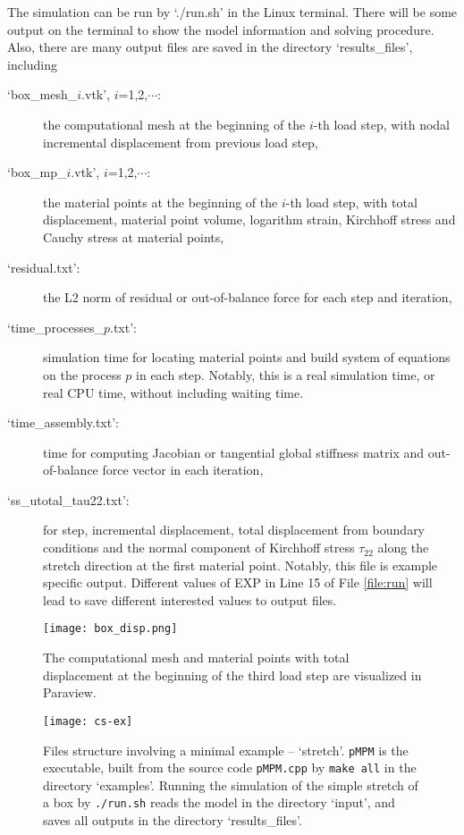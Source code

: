 \documentclass[10pt,a4paper]{article}
\newcommand{\code}[1]{\texttt{#1}}
\begin{document}
The simulation can be run by `./run.sh' in the Linux terminal. There will be some output on the terminal to show the model information and solving procedure. Also, there are many output files are saved in the directory `results\_files', including 
\begin{description}

\item[`box\_mesh\_$i$.vtk', $i$=1,2,$\cdots$:]  the computational mesh at the beginning of the $i$-th load step, with nodal incremental displacement from previous load step, 
\item[`box\_mp\_$i$.vtk', $i$=1,2,$\cdots$:] the material points at the beginning of the $i$-th load step, with total displacement, material point volume, logarithm strain, Kirchhoff stress and Cauchy stress at material points,
\item[`residual.txt':] the L2 norm of residual or out-of-balance force for each step and iteration,
\item[`time\_processes\_$p$.txt':] simulation time for locating material points and build system of equations on the process $p$ in each step. Notably, this is a real simulation time, or real CPU time, without including waiting time. 
\item[`time\_assembly.txt':] time for computing Jacobian or tangential global stiffness matrix and out-of-balance force vector in each iteration, 
\item[`ss\_utotal\_tau22.txt':] for step, incremental displacement, total displacement from boundary conditions and the normal component of Kirchhoff stress $\tau_{22}$ along the stretch direction at the first material point. Notably, this file is example specific output. Different values of EXP in Line 15 of File \ref{file:run} will lead to save different interested values to output files. 

\end{description}


\begin{figure}[!ht]
\centering
\texttt{[image: box\_disp.png]}
\caption{The computational mesh and material points with total displacement at the beginning of the third load step are visualized in Paraview.}
\label{fig:box_disp}
\end{figure}


\begin{figure}[htb]
\centering
\texttt{[image: cs-ex]}
\caption{Files structure involving a minimal example -- `stretch'. \code{pMPM} is the executable, built from the source code \code{pMPM.cpp} by \code{make all} in the directory `examples'. Running the simulation of the simple stretch of a box by \code{./run.sh} reads the model in the directory `input', and saves all outputs in the directory `results\_files'.}
\label{fig:cs-exp}
\end{figure}
\end{document}
